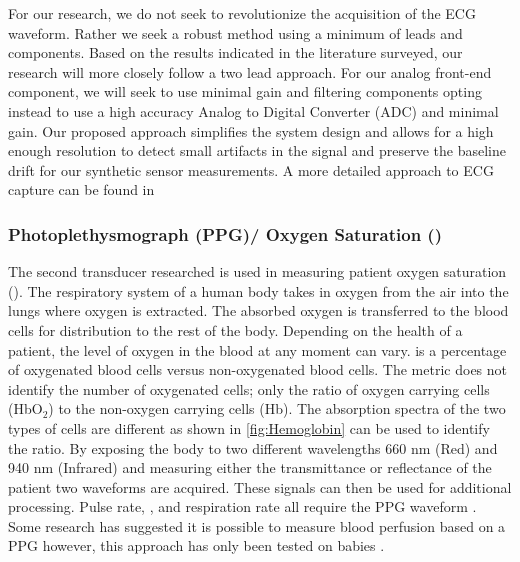 For our research, we do not seek to revolutionize the acquisition of the ECG waveform. Rather we seek a robust method using a minimum of leads and components. Based on the results indicated in the literature surveyed, our research will more closely follow a two lead approach. For our analog front-end component, we will seek to use minimal gain and filtering components opting instead to use a high accuracy Analog to Digital Converter (ADC) and minimal gain. Our proposed approach simplifies the system design and allows for a high enough resolution to detect small artifacts in the signal and preserve the baseline drift for our synthetic sensor measurements. A more detailed approach to ECG capture can be found in 



\subsubsection[Photoplethysmograph(PPG)]{Photoplethysmograph (PPG)/ Oxygen Saturation ()}
\label{subsubsec:Photoplethysmograph}
The second transducer researched is used in measuring patient oxygen saturation (). The respiratory system of a human body takes in oxygen from the air into the lungs where oxygen is extracted. The absorbed oxygen is transferred to the blood cells for distribution to the rest of the body. Depending on the health of a patient, the level of oxygen in the blood at any moment can vary.  is a percentage of oxygenated blood cells versus non-oxygenated blood cells. The  metric does not identify the number of oxygenated cells; only the ratio of oxygen carrying cells (HbO$_2$) to the non-oxygen carrying cells (Hb). The absorption spectra of the two types of cells are different as shown in \cref{fig:Hemoglobin}\cite{Prahl1998} can be used to identify the ratio. By exposing the body to two different wavelengths 660 nm (Red) and 940 nm (Infrared) and measuring either the transmittance or reflectance of the patient two waveforms are acquired. These signals can then be used for additional processing. Pulse rate, , and respiration rate all require the PPG waveform \cite{Scully2012} \cite{Kraitl2011}.  Some research has suggested it is possible to measure blood perfusion based on a PPG however, this approach has only been tested on babies \cite{Noor2011}.


